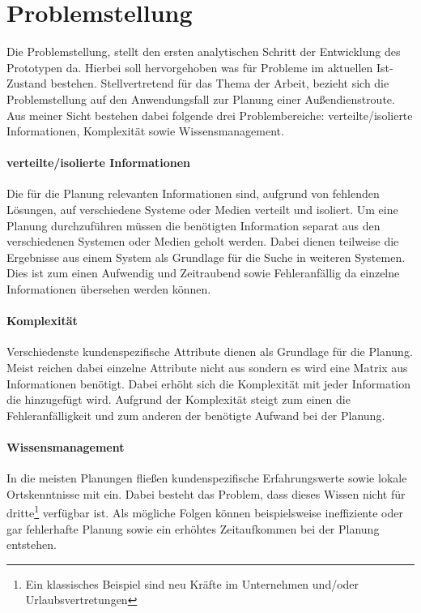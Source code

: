 \documentclass[Bachelorarbeit.tex]{subfiles}
\begin{document}
\section{Problemstellung}
\label{chap:einfuehrung:sec:problemstellung}
Die Problemstellung, stellt den ersten analytischen Schritt der Entwicklung des Prototypen da.
Hierbei soll hervorgehoben was für Probleme im aktuellen Ist-Zustand bestehen.
Stellvertretend für das Thema der Arbeit, bezieht sich die Problemstellung auf den Anwendungsfall zur Planung einer Außendienstroute.
Aus meiner Sicht bestehen dabei folgende drei Problembereiche: verteilte/isolierte Informationen, Komplexität sowie Wissensmanagement.

\paragraph*{verteilte/isolierte Informationen}
Die für die Planung relevanten Informationen sind, aufgrund von fehlenden Lösungen, auf verschiedene Systeme oder Medien verteilt und isoliert. 
Um eine Planung durchzuführen müssen die benötigten Information separat aus den verschiedenen Systemen oder Medien geholt werden.
Dabei dienen teilweise die Ergebnisse aus einem System als Grundlage für die Suche in weiteren Systemen.
Dies ist zum einen Aufwendig und Zeitraubend sowie Fehleranfällig da einzelne Informationen übersehen werden können.
\newpage

\paragraph*{Komplexität}
Verschiedenste kundenspezifische Attribute dienen als Grundlage für die Planung.
Meist reichen dabei einzelne Attribute nicht aus sondern es wird eine Matrix aus Informationen benötigt.
Dabei erhöht sich die Komplexität mit jeder Information die hinzugefügt wird.
Aufgrund der Komplexität steigt zum einen die Fehleranfälligkeit und zum anderen der benötigte Aufwand bei der Planung.

\paragraph*{Wissensmanagement}
In die meisten Planungen fließen kundenspezifische Erfahrungswerte sowie lokale Ortskenntnisse mit ein.
Dabei besteht das Problem, dass dieses Wissen nicht für dritte\footnote{Ein klassisches Beispiel sind neu Kräfte im Unternehmen und/oder Urlaubsvertretungen} verfügbar ist.
Als mögliche Folgen können beispielsweise ineffiziente oder gar fehlerhafte Planung sowie ein erhöhtes Zeitaufkommen bei der Planung entstehen. 
\end{document}
